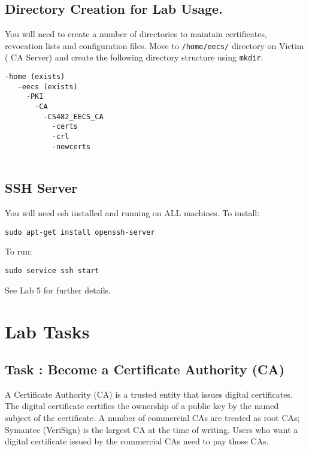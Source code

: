 \documentclass{article}
\begin{document}

\subsection{Directory Creation for Lab Usage.} You will need to create a number of directories to maintain certificates, revocation lists and configuration files. Move to {\tt /home/eecs/} directory on Victim (
CA Server) and create the following directory structure using {\tt mkdir}:

\begin{Verbatim}[frame=single]
 -home (exists)
   -eecs (exists)
     -PKI
       -CA
         -CS482_EECS_CA
           -certs
           -crl
           -newcerts
 

\end{Verbatim}

\subsection{SSH Server} 
You will need ssh installed and running on ALL machines.  To install:

\begin{Verbatim}
sudo apt-get install openssh-server
\end{Verbatim}

To run:

\begin{Verbatim}
sudo service ssh start
\end{Verbatim}

See Lab 5 for further details.


\section{Lab Tasks}

\subsection{Task \mytask: Become a Certificate Authority (CA)}

A Certificate Authority (CA) is a trusted entity that issues digital certificates. 
The digital certificate certifies the ownership of a public key by 
the named subject of the certificate. A number of commercial 
CAs are treated as root CAs; Symantec (VeriSign) is the largest CA at the time of 
writing. Users who want a digital certificate issued
by the commercial CAs need to pay those CAs.
\end{document}
